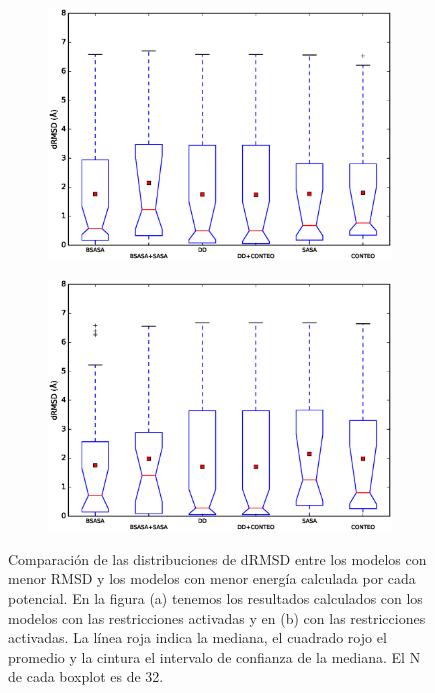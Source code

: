 \begin{figure}[hp]
  \centering  
  \begin{subfigure}{.8\linewidth}
    \centering
    \includegraphics[width=\linewidth]{figures/resultados/dna/initial15.eps}
    \caption{}
  \end{subfigure}
  \begin{subfigure}{.8\linewidth}
    \centering
    \includegraphics[width=\linewidth]{figures/resultados/dna/initial15_rsr_off.eps}
    \caption{}
  \end{subfigure}
 
\caption[Comparación de las distribuciones de dRMSD entre los modelos con menor RMSD y los modelos con menor energía calculado por cada potencial]{Comparación de las distribuciones de dRMSD entre los modelos con menor RMSD y los modelos con menor energía calculada por cada potencial. En la figura (a) tenemos los resultados calculados con los modelos con las restricciones activadas y en (b) con las restricciones activadas. La línea roja indica la mediana, el cuadrado rojo el promedio y la cintura el intervalo de confianza de la mediana. El N de cada boxplot es de 32.}
\label{fig:dna1}
\end{figure}

